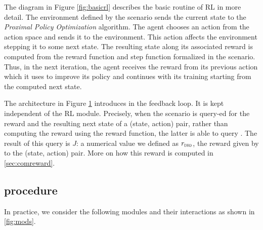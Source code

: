 \begin{figure}[H]
\begin{minipage}{.45\textwidth}
    \label{fig:diorl}
  \end{minipage}
\end{figure}

The diagram in Figure \ref{fig:basicrl} describes the basic routine of RL in more detail. The environment defined by the scenario sends the current state 
to the \emph{Proximal Policy Optimization} algorithm. The agent chooses an action from the action space and sends it to the environment. This action affects the environment stepping it to some next state. 
The resulting state along its associated reward is computed from the reward function and step function formalized in the scenario. Thus, in the next iteration, the 
agent receives the reward from its previous action which it uses to improve its policy and continues with its training starting from the computed next state.  

The architecture in Figure \ref{fig:diorl} introduces \dio{} in the feedback loop. It is kept independent of the RL module. Precisely, when the scenario is query-ed for the reward and 
the resulting next state of a (state, action) pair, rather than
computing the reward using the reward function, the latter is able to
query \dio{}. The result of this query is $J$: a numerical value 
we defined as $r_{\textsc{dio}}{}$, the reward given by \dio{} to the (state, action) pair. More on how this reward is computed in \ref{sec:comreward}.
 

\subsection{\dio{} procedure}
\label{sec:modules}
In practice, we consider the following modules and their interactions as shown in \ref{fig:mods}.


